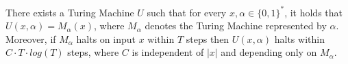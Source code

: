 \begin{definition}[title = Theorem]
    There exists a Turing Machine $U$ such that for every $x, \alpha \in \{0,1\}^*$, it holds that $U(x, \alpha) = M_{\alpha}(x)$, where $M_{\alpha}$ denotes 
    the Turing Machine represented by $\alpha$. Moreover, if $M_{\alpha}$ halts on input $x$ within $T$ steps then $U(x,\alpha)$ halts within $C \cdot T \cdot log(T)$
    steps, where $C$ is independent of $|x|$ and depending only on $M_{\alpha}$.
\end{definition}